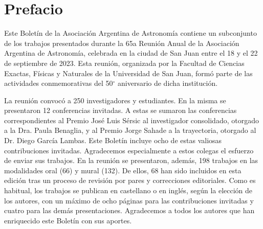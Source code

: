 \documentclass[
	a4paper,
  10pt,
  twoside,
  onesidepapers,
  electronic,
  binding=0mm,
  papers=final,
  paperselec=all,
	linkcolor=blue,
	colorheaders=black
]{confproc}
\author{\procpdfauthor}
\title{\procpdftitle}
\date{\today}
\begin{document}
\frontmatter
{}
\cfoot{\makebox[\textwidth][c]{\thepage}}
\setcounter{page}{-2}




\newpage \phantom{.} \newpage



\newpage \phantom{.} \newpage



\newpage \phantom{.} \newpage

\setcounter{page}{7}
\otherpagestyle

\setlength{\oddsidemargin}{-5mm}
\setlength{\evensidemargin}{-5mm}
\setlength{\textwidth}{10pt}

\section{Prefacio}


Este Bolet\'in de la Asociaci\'on Argentina de Astronom\'ia contiene un subconjunto  de los trabajos presentados durante la 65a Reuni\'on Anual de la Asociaci\'on Argentina de Astronom\'ia, celebrada en la ciudad de San Juan entre el 18 y el 22 de septiembre de 2023. Esta reuni\'on, organizada por la Facultad de Ciencias Exactas, F\'isicas y Naturales de la Universidad de San Juan, form\'o parte de las actividades conmemorativas del 50$^\circ$ aniversario de dicha instituci\'on.

La reuni\'on convoc\'o a 250 investigadores y estudiantes. En la misma se presentaron 12 conferencias invitadas. A estas se sumaron las conferencias correspondientes al Premio José Luis Sérsic al investigador consolidado, otorgado a la Dra. Paula Benaglia, y al Premio Jorge Sahade a la trayectoria, otorgado al Dr. Diego García Lambas. Este Bolet\'in incluye ocho de estas valiosas contribuciones invitadas. Agradecemos especialmente a estos colegas el esfuerzo de enviar sus trabajos.  En la reuni\'on se presentaron, adem\'as, 198 trabajos en las modalidades oral (66) y mural (132). De ellos,  68 han sido incluidos en esta edici\'on tras un proceso de revisi\'on por pares y correcciones editoriales. Como es habitual, los trabajos se publican en castellano o en ingl\'es, seg\'un la elecci\'on de los autores, con un m\'aximo de ocho p\'aginas para las contribuciones invitadas y cuatro para las dem\'as presentaciones. Agradecemos a todos los autores que han enriquecido este Bolet\'in con sus aportes.
\end{document}
